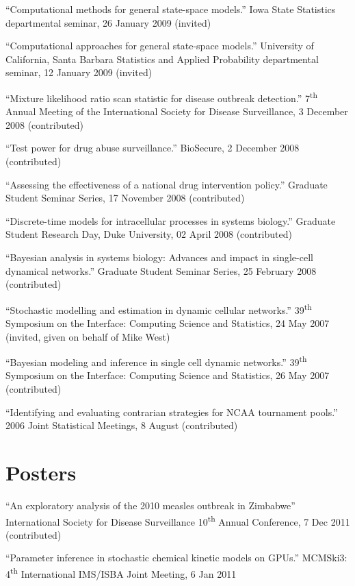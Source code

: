 \documentclass[overlapped,line,letterpaper]{res}
\begin{document}
\begin{resume}
{``Computational methods for general state-space models.'' Iowa State Statistics  departmental seminar, 26 January 2009 (invited)


``Computational approaches for general state-space models.'' University of California, Santa Barbara Statistics and Applied Probability departmental seminar, 12 January 2009 (invited)

``Mixture likelihood ratio scan statistic for disease outbreak detection.'' 7\textsuperscript{th} Annual Meeting of the International Society for Disease Surveillance, 3 December 2008 (contributed)

``Test power for drug abuse surveillance.'' BioSecure, 2 December 2008 (contributed)

``Assessing the effectiveness of a national drug intervention policy.'' Graduate Student Seminar Series, 17 November 2008 (contributed)

``Discrete-time models for intracellular processes in systems biology.'' Graduate Student Research Day, Duke University, 02 April 2008 (contributed)

``Bayesian analysis in systems biology: Advances and impact in single-cell dynamical networks.'' Graduate Student Seminar Series, 25 February 2008 (contributed)

``Stochastic modelling and estimation in dynamic cellular networks.'' 39\textsuperscript{th} Symposium on the Interface: Computing Science and Statistics, 24 May 2007 (invited, given on behalf of Mike West)

``Bayesian modeling and inference in single cell dynamic networks.'' 39\textsuperscript{th} Symposium on the Interface: Computing Science and Statistics, 26 May 2007 (contributed)

``Identifying and evaluating contrarian strategies for NCAA tournament pools.'' 2006 Joint Statistical Meetings, 8 August (contributed)

}


\section{\bf Posters}

{\small

``An exploratory analysis of the 2010 measles outbreak in Zimbabwe'' International Society for Disease Surveillance 10\textsuperscript{th} Annual Conference, 7 Dec 2011 (contributed)

``Parameter inference in stochastic chemical kinetic models on GPUs.'' MCMSki3: 4\textsuperscript{th} International IMS/ISBA Joint Meeting, 6 Jan 2011

}
\end{resume}
\end{document}
